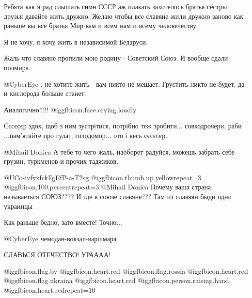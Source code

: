  
 
 
 
 
\zzSecCmt

\begin{itemize} %

Ребята как я рад слышать гимн СССР аж плакать захотелось братья сёстры друзья
давайте жить дружно. Желаю чтобы все славяне жили дружно заново как раньше вы
все братья Мир вам и всем нам и всему человечеству 

\begin{itemize} %
Я не хочу, я хочу жить в независимой Беларуси.

Жаль что славяне пропили мою родину - Советский Союз. И вообще сдали полмира.

 @CyberEye , не хотите жить - вам никто не мешает. Грустить никто не будет, да и кислорода больше станет.

Аналогично!!!!!  @igg{fbicon.face.crying.loudly} 

Сєсєсєр здох, щоб з ним зустрітися, потрібно теж зробити... совкодрочери, раби
...пам'ятайте про гулаг, голодомор... ото і весь сєсєсєр. 

 @Mihail Donica  А тебе то чего жаль, наоборот радуйся, можешь забрать себе грузин, туркменов и прочих таджиков.

@UCo-ivfxxfckFgEfP-a-T2sg  @igg{fbicon.thumb.up.yellow}{repeat=3}  @igg{fbicon.100.percent}{repeat=3} 
 @Mihail Donica  Почему ваша страна называеться СОЮЗ???? И где в союзе славяне??? Там из славяян быди одни украинцы

Как раньше бедно, зато вместе! Точно...

 @CyberEye  чемодан-вокзал-варшмара 

СЛАВЬСЯ ОТЕЧЕСТВО! УРАААА!

@igg{fbicon.flag.by} @igg{fbicon.heart.red} @igg{fbicon.flag.rossia}
@igg{fbicon.heart.red} @igg{fbicon.flag.ukraina}
@igg{fbicon.heart.red} @igg{fbicon.person.raising.hand}
@igg{fbicon.heart.red}{repeat=10}


\end{itemize}
\end{itemize}
